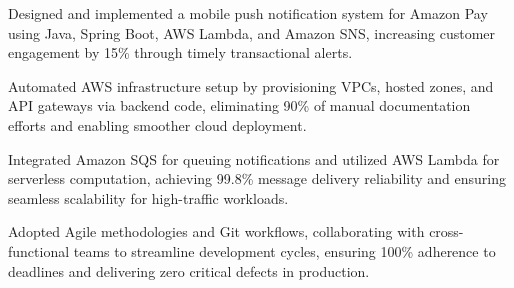 \vspace{4pt}
\begin{tightemize}
    \item Designed and implemented a mobile push notification system for Amazon Pay using Java, Spring Boot, AWS Lambda, and Amazon SNS, increasing customer engagement by 15\% through timely transactional alerts.
    \item Automated AWS infrastructure setup by provisioning VPCs, hosted zones, and API gateways via backend code, eliminating 90\% of manual documentation efforts and enabling smoother cloud deployment.
    \item Integrated Amazon SQS for queuing notifications and utilized AWS Lambda for serverless computation, achieving 99.8\% message delivery reliability and ensuring seamless scalability for high-traffic workloads.
    \item Adopted Agile methodologies and Git workflows, collaborating with cross-functional teams to streamline development cycles, ensuring 100\% adherence to deadlines and delivering zero critical defects in production.
\end{tightemize}
